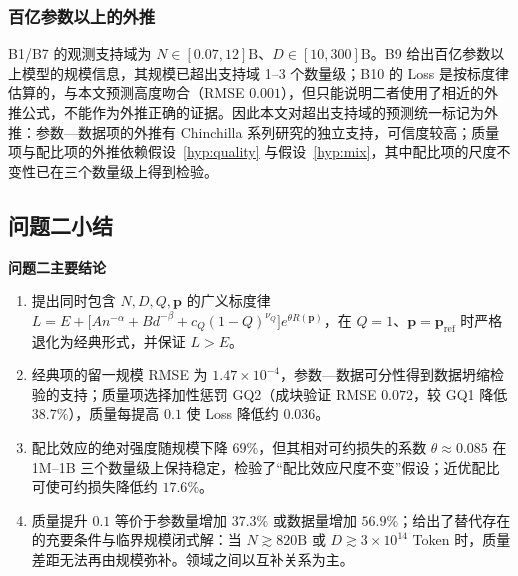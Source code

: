 \subsubsection{百亿参数以上的外推}

B1/B7 的观测支持域为 $N\in[0.07,12]\mathrm{B}$、$D\in[10,300]\mathrm{B}$。B9 给出百亿参数以上模型的规模信息，其规模已超出支持域 1--3 个数量级；B10 的 Loss 是按标度律估算的，与本文预测高度吻合（RMSE $0.001$），但只能说明二者使用了相近的外推公式，不能作为外推正确的证据。因此本文对超出支持域的预测统一标记为外推：参数—数据项的外推有 Chinchilla 系列研究的独立支持\cite{hoffmann2022compute,besiroglu2024chinchilla}，可信度较高；质量项与配比项的外推依赖假设~\ref{hyp:quality} 与假设~\ref{hyp:mix}，其中配比项的尺度不变性已在三个数量级上得到检验。

\subsection{问题二小结}

\begin{conclusionbox}
\textbf{问题二主要结论}
\begin{enumerate}
\item 提出同时包含 $N,D,Q,\boldsymbol p$ 的广义标度律 $L=E+\big[An^{-\alpha}+Bd^{-\beta}+c_Q(1-Q)^{\nu_Q}\big]e^{\theta R(\boldsymbol p)}$，在 $Q=1$、$\boldsymbol p=\boldsymbol p_{\mathrm{ref}}$ 时严格退化为经典形式，并保证 $L>E$。
\item 经典项的留一规模 RMSE 为 $1.47\times10^{-4}$，参数—数据可分性得到数据坍缩检验的支持；质量项选择加性惩罚 GQ2（成块验证 RMSE $0.072$，较 GQ1 降低 $38.7\%$），质量每提高 $0.1$ 使 Loss 降低约 $0.036$。
\item 配比效应的绝对强度随规模下降 $69\%$，但其相对可约损失的系数 $\theta\approx0.085$ 在 1M--1B 三个数量级上保持稳定，检验了“配比效应尺度不变”假设；近优配比可使可约损失降低约 $17.6\%$。
\item 质量提升 $0.1$ 等价于参数量增加 $37.3\%$ 或数据量增加 $56.9\%$；给出了替代存在的充要条件与临界规模闭式解：当 $N\gtrsim820\mathrm{B}$ 或 $D\gtrsim3\times10^{14}$ Token 时，质量差距无法再由规模弥补。领域之间以互补关系为主。
\end{enumerate}
\end{conclusionbox}
